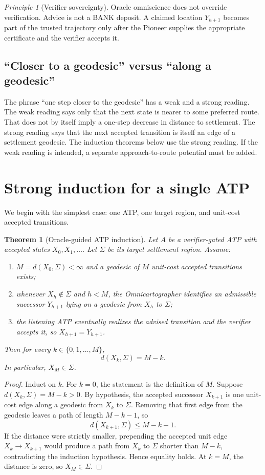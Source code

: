 \documentclass[11pt]{article}
\newtheorem{theorem}[definition]{Theorem}
\theoremstyle{remark}
\newtheorem{principle}[definition]{Principle}
\newcommand{\Sett}{\Sigma}
\begin{document}
\begin{principle}[Verifier sovereignty]
Oracle omniscience does not override verification. Advice is not a BANK deposit. A claimed location $Y_{h+1}$ becomes part of the trusted trajectory only after the Pioneer supplies the appropriate certificate and the verifier accepts it.
\end{principle}

\subsection{``Closer to a geodesic'' versus ``along a geodesic''}
The phrase ``one step closer to the geodesic'' has a weak and a strong reading. The weak reading says only that the next state is nearer to some preferred route. That does not by itself imply a one-step decrease in distance to settlement. The strong reading says that the next accepted transition is itself an edge of a settlement geodesic. The induction theorems below use the strong reading. If the weak reading is intended, a separate approach-to-route potential must be added.

\section{Strong induction for a single ATP}

We begin with the simplest case: one ATP, one target region, and unit-cost accepted transitions.

\begin{theorem}[Oracle-guided ATP induction]
Let $A$ be a verifier-gated ATP with accepted states $X_0,X_1,\dots$. Let $\Sett$ be its target settlement region. Assume:
\begin{enumerate}[label=(\roman*)]
\item $M=d(X_0,\Sett)<\infty$ and a geodesic of $M$ unit-cost accepted transitions exists;
\item whenever $X_h\notin\Sett$ and $h<M$, the Omnicartographer identifies an admissible successor $Y_{h+1}$ lying on a geodesic from $X_h$ to $\Sett$;
\item the listening ATP eventually realizes the advised transition and the verifier accepts it, so $X_{h+1}=Y_{h+1}$.
\end{enumerate}
Then for every $k\in\{0,1,\dots,M\}$,
\[
d(X_k,\Sett)=M-k.
\]
In particular, $X_M\in\Sett$.
\end{theorem}
\begin{proof}
Induct on $k$. For $k=0$, the statement is the definition of $M$. Suppose $d(X_k,\Sett)=M-k>0$. By hypothesis, the accepted successor $X_{k+1}$ is one unit-cost edge along a geodesic from $X_k$ to $\Sett$. Removing that first edge from the geodesic leaves a path of length $M-k-1$, so
\[
d(X_{k+1},\Sett)\le M-k-1.
\]
If the distance were strictly smaller, prepending the accepted unit edge $X_k\to X_{k+1}$ would produce a path from $X_k$ to $\Sett$ shorter than $M-k$, contradicting the induction hypothesis. Hence equality holds. At $k=M$, the distance is zero, so $X_M\in\Sett$.
\end{proof}
\end{document}
